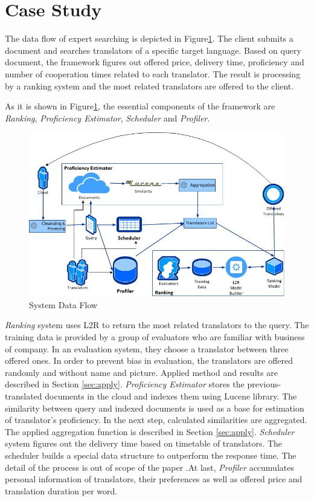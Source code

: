 \section{Case Study}
\label{sec:casestudy}
The data flow of expert searching is depicted in Figure\ref{fig:architecture}. The client submits a document and searches translators of a specific target language. Based on query document, the framework figures out offered price, delivery time, proficiency and number of cooperation times related to each translator. The result is processing by a ranking system and the most related translators are offered to the client.

As it is shown in Figure\ref{fig:architecture}, the essential components of the framework are \textit{Ranking}, \textit{Proficiency Estimator}, \textit{Scheduler} and \textit{Profiler}.

\begin{figure}[h]
\begin{center}
\includegraphics[scale=0.8]{figures/dataflow.jpg}
\caption{System Data Flow
\label{fig:architecture}}
\end{center}
\end{figure}

\textit{Ranking} system uses L2R to return the most related translators to the query. The training data is provided by a group of evaluators who are familiar with business of company. In an evaluation system, they choose a translator between three offered ones. In order to prevent bias in evaluation, the translators are offered randomly and without name and picture. Applied method and results are described in Section \ref{sec:apply}. \textit{Proficiency Estimator} stores the previous-translated documents in the cloud and indexes them using Lucene library. The similarity between query and indexed documents is used as a base for estimation of translator's proficiency. In the next step, calculated similarities are aggregated. The applied aggregation function is described in Section \ref{sec:apply}. \textit{Scheduler} system figures out the delivery time based on timetable of translators. The scheduler builds a special data structure to outperform the response time. The detail of the process is out of scope of the paper .At last, \textit{Profiler} accumulates personal information of translators, their preferences as well as offered price and translation duration per word.

